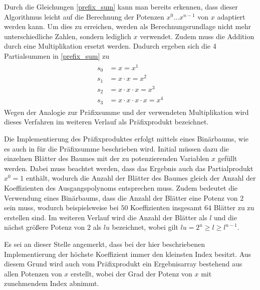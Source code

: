 Durch die Gleichungen \eqref{prefix_sum} kann man bereits erkennen, dass dieser Algorithmus leicht auf die Berechnung der Potenzen $x^0 \dots x^{n-1}$ von $x$ adaptiert werden kann. Um dies zu erreichen, werden als Berechnungsrundlage nicht mehr unterschiedliche Zahlen, sondern lediglich $x$ verwendet. Zudem muss die Addition durch eine Multiplikation ersetzt werden. Dadurch ergeben sich die 4 Partialsummen in \eqref{prefix_sum} zu
\begin{align}\label{prefix_x_prod}
\begin{split}
s_0 &= x = x^1 \\
s_1 &= x \cdot x = x^2 \\
s_2 &= x \cdot x \cdot x = x^3 \\
s_3 &= x \cdot x \cdot x \cdot x = x^4
\end{split}
\end{align}
Wegen der Analogie zur Präfixsumme und der verwendeten Multiplikation wird dieses Verfahren im weiteren Verlauf als Präfixprodukt bezeichnet.

Die Implementierung des Präfixproduktes erfolgt mittels eines Binärbaums, wie es auch in \cite{Harris:2014} für die Präfixsumme beschrieben wird. Initial müssen dazu die einzelnen Blätter des Baumes mit der zu potenzierenden Variablen $x$ gefüllt werden. Dabei muss beachtet werden, dass das Ergebnis auch das Partialprodukt $x^0 = 1$ enthält, wodurch die Anzahl der Blätter des Baumes gleich der Anzahl der Koeffizienten des Ausgangspolynoms entsprechen muss. Zudem bedeutet die Verwendung eines Binärbaums, dass die Anzahl der Blätter eine Potenz von $2$ sein muss, wodurch beispielsweise bei $50$ Koeffizienten insgesamt $64$ Blätter zu zu erstellen sind. Im weiteren Verlauf wird die Anzahl der Blätter als $l$ und die nächst größere Potenz von $2$ als $lu$ bezeichnet, wobei gilt $lu=2^u \ge l \ge l^{u-1}$.\newline

Es sei an dieser Stelle angemerkt, dass bei der hier beschriebenen Implementierung der höchste Koeffizient immer den kleinsten Index besitzt. Aus diesem Grund wird auch vom Präfixprodukt ein Ergebnisarray bestehend aus allen Potenzen von $x$ erstellt, wobei der Grad der Potenz von $x$ mit zunehmendem Index abnimmt.\newline

